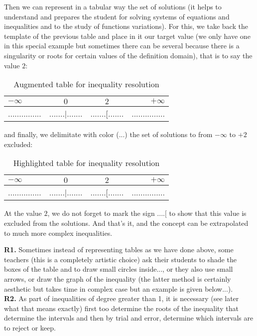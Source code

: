 \begin{tcolorbox}[colframe=black,colback=white,sharp corners]
	Then we can represent in a tabular way the set of solutions (it helps to understand and prepares the student for solving systems of equations and inequalities and to the study of functions variations). For this, we take back the template of the previous table and place in it our target value (we only have one in this special example but sometimes there can be several because there is a singularity or roots for certain values of the definition domain), that is to say the value $2$:
	\begin{table}[H]
		\begin{center}
		\begin{tabular}{|l|c|c|r|}
		\hline 
		{\cellcolor{black!30}$-\infty$} & {\cellcolor{black!30}$0$} & {\cellcolor{black!30}$2$} & {\cellcolor{black!30}$+\infty$}\\ 
		\hline 
		............... & .......|....... & .......[....... & ............... \\  
		\hline 
		\end{tabular} 
		\end{center}
		\caption{Augmented table for inequality resolution}
	\end{table}
	and finally, we delimitate with color (...) the set of solutions to from $-\infty$ to $+2$ excluded:
	\begin{table}[H]
		\begin{center}
		\begin{tabular}{|l|c|c|r|}
		\hline 
		{\cellcolor{black!30}$-\infty$} & {\cellcolor{black!30}$0$} & {\cellcolor{black!30}$2$} & {\cellcolor{black!30}$+\infty$}\\ 
		\hline 
		{\cellcolor{green!30}...............} & {\cellcolor{green!30}.......|.......}  & {\cellcolor{green!30}.......[.......} & ............... \\  
		\hline 
		\end{tabular} 
		\end{center}
		\caption{Highlighted table for inequality resolution}
	\end{table}
	At the value $2$, we do not forget to mark the sign $....[$ to show that this value is excluded from the solutions. And that's it, and the concept can be extrapolated to much more complex inequalities.
	\end{tcolorbox}
	\begin{tcolorbox}[title=Remark,colframe=black,arc=10pt]
	\textbf{R1.} Sometimes instead of representing tables as we have done above, some teachers (this is a completely artistic choice) ask their students to shade the boxes of the table and to draw small circles inside..., or they also use small arrows, or draw the graph of the inequality (the latter method is certainly aesthetic but takes time in complex case but an example is given below...).\\
	
	\textbf{R2.} As part of inequalities of degree greater than 1, it is necessary (see later what that means exactly) first too determine the roots of the inequality that determine the intervals and then by trial and error, determine which intervals are to reject or keep.
	\end{tcolorbox}

